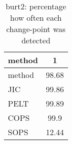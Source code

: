 \begin{table}[ht]
\centering
\begin{tabular}{l|c}
  \hline
method & 1 \\ 
  \hline
method &  98.68 \\ 
  JIC &  99.86 \\ 
  PELT &  99.89 \\ 
  COPS &   99.9 \\ 
  SOPS &  12.44 \\ 
   \hline
\end{tabular}
\caption{burt2: percentage how often each change-point was detected} 
\label{tab:burt2Detections}
\end{table}
